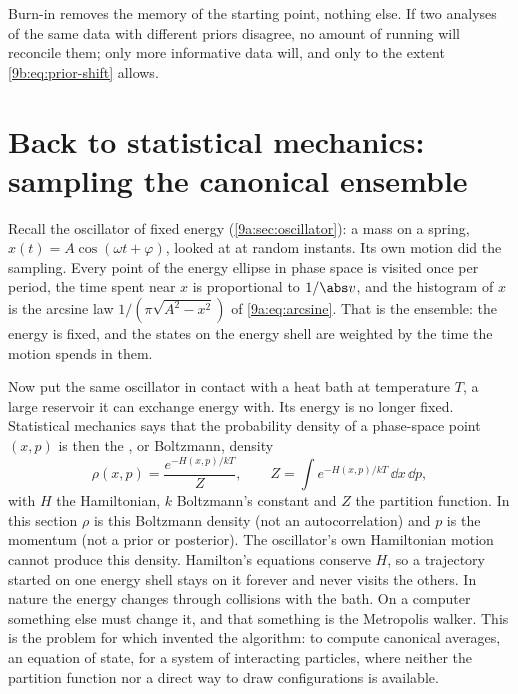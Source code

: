 \begin{pitfall}
Burn-in removes the memory of the starting point, nothing else. If two analyses of the same data
with different priors disagree, no amount of running will reconcile them; only more informative
data will, and only to the extent \eqref{9b:eq:prior-shift} allows.
\end{pitfall}
\section{Back to statistical mechanics: sampling the canonical ensemble}
\label{9b:sec:canonical}

Recall the oscillator of fixed energy (\cref{9a:sec:oscillator}): a mass on a
spring, $x(t)=A\cos(\omega t+\varphi)$, looked at at random instants. Its own motion did the
sampling. Every point of the energy ellipse in phase space is visited once per period, the time
spent near $x$ is proportional to $1/\abs v$, and the histogram of $x$ is the arcsine law
$1/(\pi\sqrt{A^2-x^2})$ of \eqref{9a:eq:arcsine}. That is the  ensemble:
the energy is fixed, and the states on the energy shell are weighted by the time the motion
spends in them.

Now put the same oscillator in contact with a heat bath at temperature $T$, a large reservoir it
can exchange energy with. Its energy is no longer fixed. Statistical mechanics says that the
probability density of a phase-space point $(x,p)$ is then the , or Boltzmann,
density
\begin{equation}
  \rho(x,p)=\frac{e^{-H(x,p)/kT}}{Z},\qquad Z=\int e^{-H(x,p)/kT}\,\dd x\,\dd p ,
  \label{9b:eq:canonical}
\end{equation}
with $H$ the Hamiltonian, $k$ Boltzmann's constant and $Z$ the partition function. In this
section $\rho$ is this Boltzmann density (not an autocorrelation) and $p$ is the momentum (not a
prior or posterior). The
oscillator's own Hamiltonian motion cannot produce this density. Hamilton's equations conserve
$H$, so a trajectory started on one energy shell stays on it forever and never visits the others.
In nature the energy changes through collisions with the bath. On a computer something else must
change it, and that something is the Metropolis walker. This is the problem for which
\textcite{Metropolis1953} invented the algorithm: to compute canonical averages, an equation of
state, for a system of interacting particles, where neither the partition function nor a direct
way to draw configurations is available.

